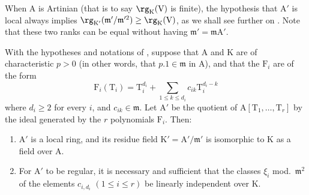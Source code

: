 
\begin{remark}[22.4.2]
\label{0.22.4.2}
When $\mathrm{A}$ is Artinian (that is to say $\rg_\mathrm{K}(\mathrm{V})$ is finite), the hypothesis that $\mathrm{A}'$ is local always implies $\rg_{\mathrm{K}'}(\mathfrak{m}'/\mathfrak{m}'^2)\geq\rg_\mathrm{K}(\mathrm{V})$, as we shall see further on .
Note that these two ranks can be equal without having $\mathfrak{m}'=\mathfrak{m}\mathrm{A}'$.
\end{remark}

\begin{proposition}[22.4.3]
\label{0.22.4.3}
With the hypotheses and notations of , suppose that $\mathrm{A}$ and $\mathrm{K}$ are of characteristic $p>0$ (in other words, that $p.1\in\mathfrak{m}$ in $\mathrm{A}$), and that the $\mathrm{F}_i$ are of the form
\[
\label{0.22.4.3.1}
  \mathrm{F}_i(\mathrm{T}_i)=\mathrm{T}_i^{d_i}+\sum_{1\leq k\leq d_i}c_{ik}\mathrm{T}_i^{d_i-k}
  \tag{22.4.3.1}
\]
where $d_i\geq 2$ for every $i$, and $c_{ik}\in\mathfrak{m}$.
Let $\mathrm{A}'$ be the quotient of $\mathrm{A}[\mathrm{T}_1,\ldots,\mathrm{T}_r]$ by the ideal generated by the $r$ polynomials $\mathrm{F}_i$.
Then:
\begin{enumerate}
  \item[\rm{(i)}] $\mathrm{A}'$ is a local ring, and its residue field $\mathrm{K}'=\mathrm{A}'/\mathfrak{m}'$ is isomorphic to $\mathrm{K}$ as a field over $\mathrm{A}$.
  \item[\rm{(ii)}] For $\mathrm{A}'$ to be regular, it is necessary and sufficient that the classes $\xi_i$ mod.~$\mathfrak{m}^2$ of the elements $c_{i,d_i}$ $(1\leq i\leq r)$ be linearly independent over $\mathrm{K}$.
\end{enumerate}
\end{proposition}

